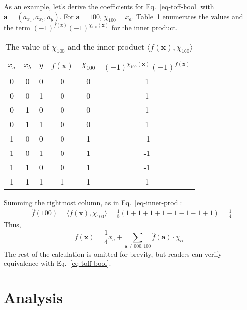 \documentclass[a4paper]{article}
\begin{document}
\begin{example}
As an example, let's derive the coefficients for Eq.~\ref{eq-toff-bool} with $\mathbf{a} = (a_{x_a}, a_{x_b}, a_y)$.
For $\mathbf{a} = 100$, $\chi_{100} = x_a$. Table~\ref{table-ex-100} enumerates the values and the term $(-1)^{f(\mathbf{x})} (-1)^{\chi_{100}(\mathbf{x})}$ for the inner product.
\begin{table}[h]
  \begin{center}
    \begin{tabular}{c|c|c|c|c|c}
      \hline
      $x_a$ & $x_b$ & $y$ & $f(\mathbf{x})$ & $\chi_{100}$ & $(-1)^{\chi_{100}(\mathbf{x})} (-1)^{f(\mathbf{x})}$ \\\hline
      0 & 0 & 0 & 0 & 0 & 1\\\hline
      0 & 0 & 1 & 0 & 0 & 1\\\hline
      0 & 1 & 0 & 0 & 0 & 1\\\hline
      0 & 1 & 1 & 0 & 0 & 1\\\hline
      1 & 0 & 0 & 0 & 1 & -1\\\hline
      1 & 0 & 1 & 0 & 1 & -1\\\hline
      1 & 1 & 0 & 0 & 1 & -1\\\hline      
      1 & 1 & 1 & 1 & 1 & 1\\\hline
    \end{tabular}
    \caption{The value of $\chi_{100}$ and the inner product $\langle f(\mathbf{x}), \chi_{100} \rangle$}
    \label{table-ex-100}
  \end{center}
\end{table}

Summing the rightmost column, as in Eq.~\ref{eq-inner-prod}:
\begin{align}
    &\hat{f}(100) = \langle f(\mathbf{x}), \chi_{100} \rangle = \frac{1}{8} ( 1 + 1 + 1 + 1 - 1 - 1 - 1 + 1 ) = \frac{1}{4}
\end{align}
Thus,
\begin{equation}
  f(\mathbf{x}) = \frac{1}{4}x_a + \sum_{\mathbf{a} \neq 000,100} \hat{f}(\mathbf{a}) \cdot \chi_{\mathbf{a}}
\end{equation}
The rest of the calculation is omitted for brevity, but readers can verify equivalence with Eq.~\ref{eq-toff-bool}.
\end{example}

\section{Analysis}
\end{document}
